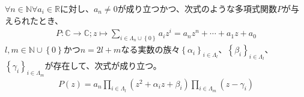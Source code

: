 \documentclass[dvipdfmx]{jsarticle}
\begin{document}
\begin{thm}\label{4.3.2.13}
$\forall n \in \mathbb{N}\forall a_{i} \in \mathbb{R}$に対し、$a_{n} \neq 0$が成り立つかつ、次式のような多項式関数$P$が与えられたとき、
\begin{align*}
P:\mathbb{C} \rightarrow \mathbb{C};z \mapsto \sum_{i \in \varLambda_{n} \cup \left\{ 0 \right\}} {a_{i}z^{i}} = a_{n}z^{n} + \cdots + a_{1}z + a_{0}
\end{align*}
$l,m \in \mathbb{N} \cup \left\{ 0 \right\}$かつ$n = 2l + m$なる実数の族々$\left\{ \alpha_{i} \right\}_{i \in \varLambda_{l}}$、$\left\{ \beta_{i} \right\}_{i \in \varLambda_{l}}$、$\left\{ \gamma_{i} \right\}_{i \in \varLambda_{m}}$が存在して、次式が成り立つ。
\begin{align*}
P(z) = a_{n}\prod_{i \in \varLambda_{l}} \left( z^{2} + \alpha_{i}z + \beta_{i} \right)\prod_{i \in \varLambda_{m}} \left( z - \gamma_{i} \right)
\end{align*}
\end{thm}
\end{document}
